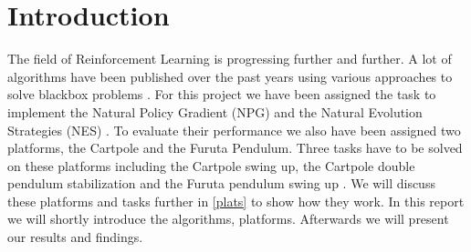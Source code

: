 \section{Introduction}
\label{intro}
The field of Reinforcement Learning is progressing further and further. A lot of algorithms have been published over the past years using various approaches to solve blackbox problems \cite{Wierstra14}. For this project we have been assigned the task to implement the Natural Policy Gradient (NPG) \cite{Rajeswaran2017,Kakade2001} and the Natural Evolution Strategies (NES) \cite{Wierstra14}. To evaluate their performance we also have been assigned two platforms, the Cartpole and the Furuta Pendulum. Three tasks have to be solved on these platforms including the Cartpole swing up, the Cartpole double pendulum stabilization and the Furuta pendulum swing up \cite{Furuta1991}. We will discuss these platforms and tasks further in \autoref{plats} to show how they work. In this report we will shortly introduce the algorithms, platforms. Afterwards we will present our results and findings.

